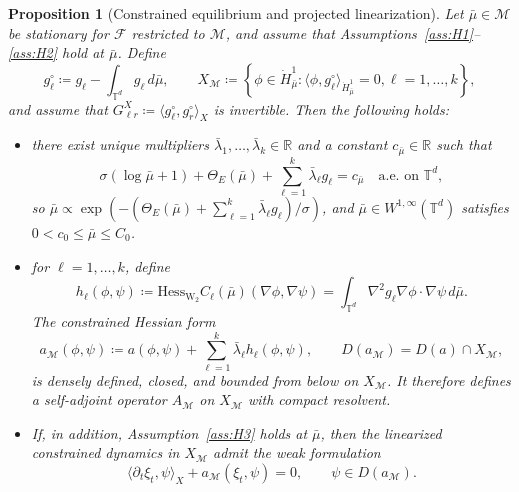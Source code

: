 \documentclass[10pt,a4paper]{amsart}
\newtheorem{proposition}{Proposition}
\newcommand{\F}{\mathcal{F}}
\newcommand{\R}{\mathbb{R}}
\newcommand{\T}{\mathbb{T}}
\newcommand{\Wtwo}{\operatorname{W}_2}
\newcommand{\potential}[1][\mu]{\dot{H}^1_{#1}}
\begin{document}
\begin{proposition}[Constrained equilibrium and projected linearization]
    \label{prop:constrained_projected_hessian}
    Let $\bar\mu \in \mathcal{M}$ be stationary for $\F$ restricted to $\mathcal{M}$, and assume that Assumptions~\ref{ass:H1}--\ref{ass:H2} hold at $\bar\mu$.
    Define
    \[
    g_\ell^\circ \coloneqq g_\ell - \int_{\T^d} g_\ell \,d\bar\mu, \qquad X_{\mathcal{M}} \coloneqq \left\{\phi \in \potential[\bar\mu] : \langle \phi,g_\ell^\circ\rangle_{\potential[\bar\mu]} = 0, \ell = 1, \ldots, k\right\},
    \]
    and assume that $G^X_{\ell r} \coloneqq \langle g_\ell^\circ, g_r^\circ\rangle_{X}$ is invertible.
    Then the following holds:
    \begin{itemize}
        \item[(i)] there exist unique multipliers $\bar\lambda_1, \ldots, \bar\lambda_k \in \R$ and a constant $c_{\bar\mu} \in \R$ such that
        \begin{equation}
            \label{eq:euler_lagrange_constrained}
            \sigma(\log\bar\mu + 1) + \Theta_E(\bar\mu) + \sum_{\ell=1}^k \bar\lambda_\ell g_\ell = c_{\bar\mu} \quad \text{a.e.\ on } \T^d,
        \end{equation}
        so $\bar\mu \propto \exp \left(-(\Theta_E(\bar\mu) + \sum_{\ell=1}^k \bar\lambda_\ell g_\ell) / \sigma \right)$, and $\bar\mu \in W^{1,\infty}(\T^d)$ satisfies $0 < c_0 \le \bar\mu \le C_0$.
        \item[(ii)] for $\ell = 1, \dots, k$, define 
        \[
        h_\ell(\phi,\psi) \coloneqq \mathrm{Hess}_{\Wtwo} C_\ell(\bar\mu)(\nabla\phi, \nabla\psi) = \int_{\T^d} \nabla^2 g_\ell \nabla \phi \cdot \nabla \psi \, d\bar\mu.
        \]
        The constrained Hessian form
        \[
        a_{\mathcal{M}}(\phi,\psi) \coloneqq a(\phi,\psi) + \sum_{\ell=1}^k \bar\lambda_\ell h_\ell(\phi,\psi), \qquad D(a_{\mathcal{M}}) = D(a) \cap X_{\mathcal{M}},
        \]
        is densely defined, closed, and bounded from below on $X_{\mathcal{M}}$.
        It therefore defines a self-adjoint operator $A_{\mathcal{M}}$ on $X_{\mathcal{M}}$ with compact resolvent.
        \item[(iii)] If, in addition, Assumption~\ref{ass:H3} holds at $\bar\mu$, then the linearized constrained dynamics in $X_{\mathcal{M}}$ admit the weak formulation
        \[
        \langle \partial_t\xi_t, \psi\rangle_X + a_{\mathcal{M}}(\xi_t, \psi) = 0, \qquad \psi \in D(a_{\mathcal{M}}).
        \]
    \end{itemize}
\end{proposition}
\end{document}
